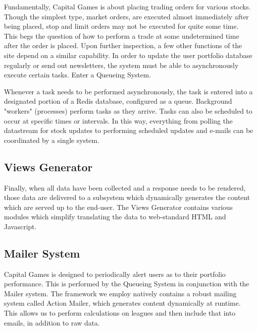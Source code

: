 Fundamentally, Capital Games is about placing trading orders for various stocks. 
Though the simplest type, market orders, are executed almost immediately after being 
placed, stop and limit orders may not be executed for quite some time. \cite{inv:market}
\cite{inv:stop} \cite{inv:limit} This begs the question of how to perform a trade
at some undetermined time after the order is placed. 
Upon further inspection, a few other functions of the site depend on a similar capability.
In order to update the user portfolio database regularly or send out newsletters, the system 
must be able to asynchronously execute certain tasks. Enter a Queueing System.

Whenever a task needs to be performed asynchronously, the task is entered into a 
designated portion of a Redis database, configured as a queue. Background "workers" 
(processes) perform tasks as they arrive. Tasks can also be scheduled to occur at specific
times or intervals. In this way, everything from polling the datastream for stock updates
to performing scheduled updates and e-mails can be coordinated by a single system.

\subsection{Views Generator}

Finally, when all data have been collected and a response needs to be rendered, those data
are delivered to a subsystem which dynamically generates the content
which are served up to the end-user. The Views Generator contains various modules which
simplify translating the data to web-standard HTML and Javascript.

\subsection{Mailer System}

Capital Games is designed to periodically alert users as to their portfolio performance.
This is performed by the Queueing System in conjunction with the Mailer system.
The framework we employ natively contains a robust mailing system called Action Mailer,
which generates content dynamically at runtime. \cite{action:mailer} This allows us to perform calculations
on leagues and then include that into emails, in addition to raw data.

